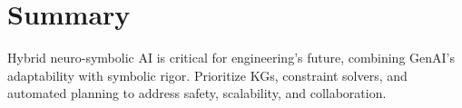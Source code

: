 \documentclass[12pt]{article}
\begin{document}
\section{Summary}
Hybrid neuro-symbolic AI is critical for engineering’s future, combining GenAI’s adaptability with symbolic rigor. Prioritize KGs, constraint solvers, and automated planning to address safety, scalability, and collaboration.



\end{document}
